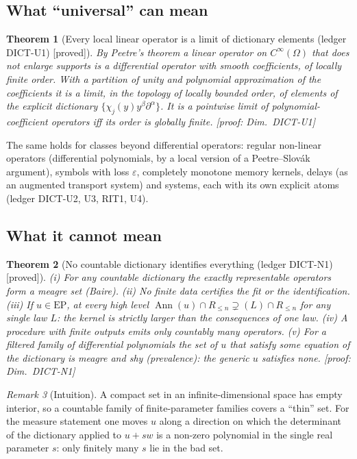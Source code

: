 \documentclass[11pt]{article}
\theoremstyle{plain}
\newtheorem{theorem}{Theorem}[section]
\theoremstyle{definition}
\theoremstyle{remark}
\newtheorem{remark}[theorem]{Remark}
\DeclareMathOperator{\Ann}{Ann}             %
\newcommand{\EP}{\mathrm{EP}}               %
\newcommand{\badge}[2]{\textcolor{#1}{\textsf{\footnotesize[#2]}}}
\newcommand{\proved}[1][]{\badge{cC}{proved#1}}
\newcommand{\led}[1]{\textcolor{cG}{\textsf{\footnotesize(ledger #1)}}}
\newenvironment{intuition}{\begin{remark}[Intuition]}{\end{remark}}
\newcommand{\dimref}[1]{\textsf{\footnotesize[proof: Dim.~#1]}}
\begin{document}
\subsection{What ``universal'' can mean}

\begin{theorem}[{Every local linear operator is a limit of dictionary elements \led{DICT-U1} \proved}]\label{thm:dictu1}
By Peetre's theorem a linear operator on $C^\infty(\Omega)$ that does not enlarge supports is a differential operator with smooth coefficients, of locally finite order. With a partition of unity and polynomial approximation of the coefficients it is a limit, in the topology of locally bounded order, of elements of the explicit dictionary $\{\chi_j(y)y^\beta\partial^\alpha\}$. It is a pointwise limit of polynomial-coefficient operators iff its order is globally finite.
\dimref{DICT-U1}
\end{theorem}

The same holds for classes beyond differential operators: regular non-linear operators (differential polynomials, by a local version of a Peetre--Slov\'ak argument), symbols with loss $\varepsilon$, completely monotone memory kernels, delays (as an augmented transport system) and systems, each with its own explicit atoms \led{DICT-U2, U3, RIT1, U4}.

\subsection{What it cannot mean}

\begin{theorem}[{No countable dictionary identifies everything \led{DICT-N1} \proved}]\label{thm:dictn1}
(i) For any countable dictionary the exactly representable operators form a meagre set (Baire). (ii) No finite data certifies the fit or the identification. (iii) If $u\in\EP$, at every high level $\Ann(u)\cap R_{\le n}\supsetneq(L)\cap R_{\le n}$ for any single law $L$: the kernel is strictly larger than the consequences of one law. (iv) A procedure with finite outputs emits only countably many operators. (v) For a filtered family of differential polynomials the set of $u$ that satisfy some equation of the dictionary is meagre \emph{and} shy (prevalence): the generic $u$ satisfies none.
\dimref{DICT-N1}
\end{theorem}

\begin{intuition}
A compact set in an infinite-dimensional space has empty interior, so a countable family of finite-parameter families covers a ``thin'' set. For the measure statement one moves $u$ along a direction on which the determinant of the dictionary applied to $u+sw$ is a non-zero polynomial in the single real parameter $s$: only finitely many $s$ lie in the bad set.
\end{intuition}
\end{document}
